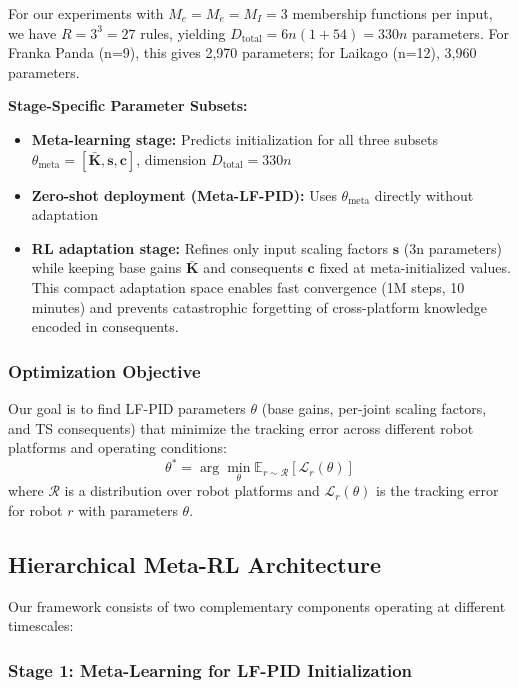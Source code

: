 \documentclass[a4paper]{cas-sc}
\begin{document}
For our experiments with $M_e=M_{\dot e}=M_I=3$ membership functions per input, we have $R = 3^3 = 27$ rules, yielding $D_{\text{total}} = 6n(1+54) = 330n$ parameters. For Franka Panda (n=9), this gives 2,970 parameters; for Laikago (n=12), 3,960 parameters.

\textbf{Stage-Specific Parameter Subsets:}
\begin{itemize}[leftmargin=*, itemsep=2pt]
    \item \textbf{Meta-learning stage:} Predicts initialization for all three subsets $\theta_{\text{meta}} = [\bar{\bm{K}}, \bm{s}, \bm{c}]$, dimension $D_{\text{total}} = 330n$
    \item \textbf{Zero-shot deployment (Meta-LF-PID):} Uses $\theta_{\text{meta}}$ directly without adaptation
    \item \textbf{RL adaptation stage:} Refines only input scaling factors $\bm{s}$ (3n parameters) while keeping base gains $\bar{\bm{K}}$ and consequents $\bm{c}$ fixed at meta-initialized values. This compact adaptation space enables fast convergence (1M steps, 10 minutes) and prevents catastrophic forgetting of cross-platform knowledge encoded in consequents.
\end{itemize}

\subsubsection{Optimization Objective}

Our goal is to find LF-PID parameters $\theta$ (base gains, per-joint scaling factors, and TS consequents) that minimize the tracking error across different robot platforms and operating conditions:
\begin{equation}
    \theta^* = \arg\min_{\theta} \mathbb{E}_{r \sim \mathcal{R}} \left[ \mathcal{L}_r(\theta) \right]
\end{equation}
where $\mathcal{R}$ is a distribution over robot platforms and $\mathcal{L}_r(\theta)$ is the tracking error for robot $r$ with parameters $\theta$.

\subsection{Hierarchical Meta-RL Architecture}

Our framework consists of two complementary components operating at different timescales:

\subsubsection{Stage 1: Meta-Learning for LF-PID Initialization}
\end{document}

